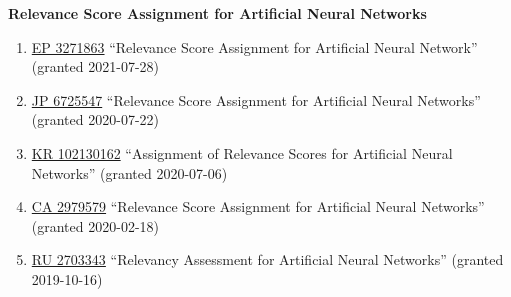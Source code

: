\documentclass[10pt,a4paper]{article} %
\begin{document}

\newcommand{\patentref}[5]{\href{#4}{#1 #2} ``#3'' (granted #5)}
\headedsection %
{\bf Relevance Score Assignment for Artificial Neural Networks}
{
    \begin{enumerate}
        \item [] \patentref{EP}
                           {3271863}
                           {Relevance Score Assignment for Artificial Neural Network}
                           {https://patents.google.com/patent/EP3271863A1/en}
                           {2021-07-28}

        \item [] \patentref{JP}
                           {6725547}
                           {Relevance Score Assignment for Artificial Neural Networks}
                           {https://patentimages.storage.googleapis.com/91/ba/cc/36792436528537/JP6725547B2.pdf}
                           {2020-07-22}

        \item [] \patentref{KR}
                           {102130162}
                           {Assignment of Relevance Scores for Artificial Neural Networks}
                           {https://patentimages.storage.googleapis.com/80/b5/17/210f687345bb31/KR102130162B1.pdf}
                           {2020-07-06}

        \item [] \patentref{CA}
                           {2979579}
                           {Relevance Score Assignment for Artificial Neural Networks}
                           {https://patents.google.com/patent/CA2979579A1/en}
                           {2020-02-18}

        \item [] \patentref{RU}
                           {2703343}
                           {Relevancy Assessment for Artificial Neural Networks}
                           {https://patentimages.storage.googleapis.com/8d/ce/b5/70ef43a6d0f6e5/RU2703343C2.pdf}
                           {2019-10-16}
    \end{enumerate}
}

\end{document}
